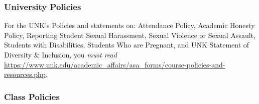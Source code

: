 \documentclass[12pt]{article}
\newcounter{ex}\setcounter{ex}{0}
\begin{document}
\subsubsection*{University Policies}

For the UNK's Policies and statements on: Attendance Policy, Academic Honesty Policy, 
Reporting Student Sexual Harassment, Sexual Violence or Sexual Assault, 
Students with Disabilities, Students Who are Pregnant, and UNK Statement of 
Diversity \& Inclusion,  you \emph{must read} \url{https://www.unk.edu/academic_affairs/asa_forms/course-policies-and-resources.php}.

\subsubsection* {Class Policies}


 
\end{document}
